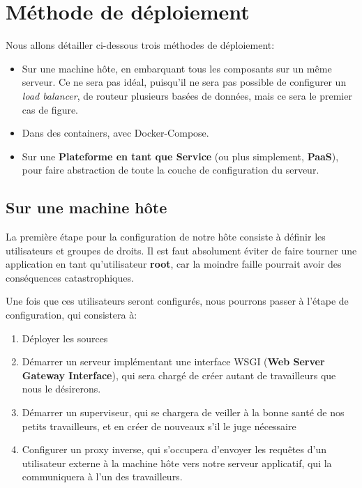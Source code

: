 \documentclass[11pt]{amsbook}
\begin{document}
\hypertarget{x-méthode-de-déploiement}{\chapter{Méthode de déploiement}}
Nous allons détailler ci-dessous trois méthodes de déploiement:


\begin{itemize}

\item Sur une machine hôte, en embarquant tous les composants sur un même serveur. Ce ne sera pas idéal, puisqu’il ne sera pas possible de configurer un \emph{load balancer}, de routeur plusieurs basées de données, mais ce sera le premier cas de figure.

\item Dans des containers, avec Docker-Compose.

\item Sur une \textbf{Plateforme en tant que Service} (ou plus simplement, \textbf{PaaS}), pour faire abstraction de toute la couche de configuration du serveur.

\end{itemize}


\hypertarget{x-sur-une-machine-hôte}{\section{Sur une machine hôte}}
La première étape pour la configuration de notre hôte consiste à définir les utilisateurs et groupes de droits. Il est faut absolument éviter de faire tourner une application en tant qu’utilisateur \textbf{root}, car la moindre faille pourrait avoir des conséquences catastrophiques.


Une fois que ces utilisateurs seront configurés, nous pourrons passer à l’étape de configuration, qui consistera à:


\begin{enumerate}

\item{Déployer les sources}

\item{Démarrer un serveur implémentant une interface WSGI (\textbf{Web Server Gateway Interface}), qui sera chargé de créer autant de  travailleurs que nous le désirerons.}

\item{Démarrer un superviseur, qui se chargera de veiller à la bonne santé de nos petits travailleurs, et en créer de nouveaux s’il le juge nécessaire}

\item{Configurer un proxy inverse, qui s’occupera d’envoyer les requêtes d’un utilisateur externe à la machine hôte vers notre serveur applicatif, qui la communiquera à l’un des travailleurs.}

\end{enumerate}
\end{document}
